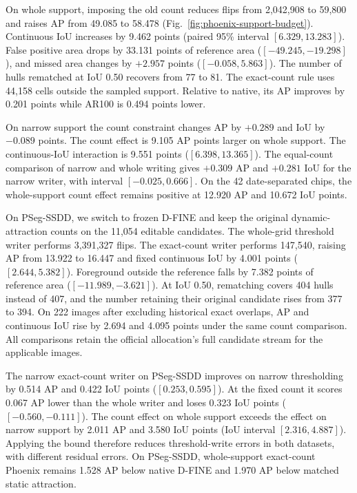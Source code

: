 \documentclass[journal]{IEEEtran}
\begin{document}
On whole support, imposing the old count reduces flips from 2,042,908 to 59,800 and raises AP from 49.085 to 58.478 (Fig.~\ref{fig:phoenix-support-budget}). Continuous IoU increases by 9.462 points (paired 95\% interval \([6.329,13.283]\)). False positive area drops by 33.131 points of reference area (\([-49.245,-19.298]\)), and missed area changes by \(+2.957\) points (\([-0.058,5.863]\)). The number of hulls rematched at IoU 0.50 recovers from 77 to 81. The exact-count rule uses 44,158 cells outside the sampled support. Relative to native, its AP improves by 0.201 points while AR100 is 0.494 points lower.

On narrow support the count constraint changes AP by \(+0.289\) and IoU by \(-0.089\) points. The count effect is 9.105 AP points larger on whole support. The continuous-IoU interaction is 9.551 points (\([6.398,13.365]\)). The equal-count comparison of narrow and whole writing gives \(+0.309\) AP and \(+0.281\) IoU for the narrow writer, with interval \([-0.025,0.666]\). On the 42 date-separated chips, the whole-support count effect remains positive at 12.920 AP and 10.672 IoU points.

On PSeg-SSDD, we switch to frozen D-FINE and keep the original dynamic-attraction counts on the 11,054 editable candidates. The whole-grid threshold writer performs 3,391,327 flips. The exact-count writer performs 147,540, raising AP from 13.922 to 16.447 and fixed continuous IoU by 4.001 points (\([2.644,5.382]\)). Foreground outside the reference falls by 7.382 points of reference area (\([-11.989,-3.621]\)). At IoU 0.50, rematching covers 404 hulls instead of 407, and the number retaining their original candidate rises from 377 to 394. On 222 images after excluding historical exact overlaps, AP and continuous IoU rise by 2.694 and 4.095 points under the same count comparison. All comparisons retain the official allocation's full candidate stream for the applicable images.

The narrow exact-count writer on PSeg-SSDD improves on narrow thresholding by 0.514 AP and 0.422 IoU points (\([0.253,0.595]\)). At the fixed count it scores 0.067 AP lower than the whole writer and loses 0.323 IoU points (\([-0.560,-0.111]\)). The count effect on whole support exceeds the effect on narrow support by 2.011 AP and 3.580 IoU points (IoU interval \([2.316,4.887]\)). Applying the bound therefore reduces threshold-write errors in both datasets, with different residual errors. On PSeg-SSDD, whole-support exact-count Phoenix remains 1.528 AP below native D-FINE and 1.970 AP below matched static attraction.
\end{document}
